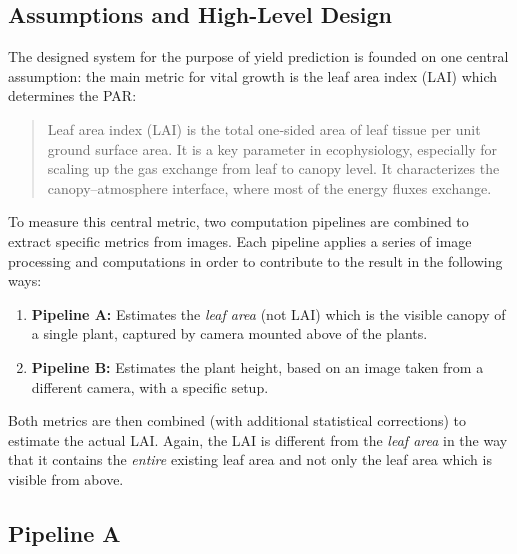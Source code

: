 \graphicspath{{members/ssr/figures/modelling}}

\subsection{Assumptions and High-Level Design}


The designed system for the purpose of yield prediction is founded on one central assumption: 
the main metric for vital growth is the leaf area index (LAI) which determines the PAR:

\begin{quote}
    \centering
    Leaf area index (LAI) is the total one‐sided area of leaf tissue per unit ground surface area.
    It is a key parameter in ecophysiology, especially for scaling up the gas exchange from leaf
    to canopy level.
    It characterizes the canopy–atmosphere interface, where most of the energy fluxes exchange. \cite{breda}
\end{quote}

To measure this central metric, two computation pipelines are combined to extract specific metrics from images.
Each pipeline applies a series of image processing and computations in order to contribute to the result
in the following ways:

\begin{enumerate}
    \item \textbf{Pipeline A:} Estimates the \textit{leaf area} (not LAI) which is the visible canopy
    of a single plant, captured by camera mounted above of the plants.
    \item \textbf{Pipeline B:} Estimates the plant height, based on an image taken from a different camera,
    with a specific setup.
\end{enumerate}

Both metrics are then combined (with additional statistical corrections) to estimate the actual LAI.
Again, the LAI is different from the \textit{leaf area} in the way that it contains
the \textit{entire} existing leaf area and not only the leaf area which is visible from above.



\subsection{Pipeline A}\label{subsec:pipeline-a}


